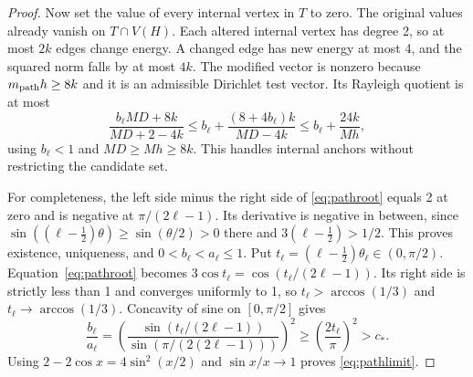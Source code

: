 \begin{proof}
Now set the value of every internal vertex in $T$ to zero. The
original values already vanish on $T\cap V(H)$. Each altered
internal vertex has degree 2, so at most $2k$ edges change energy.
A changed edge has new energy at most 4, and the squared norm
falls by at most $4k$. The modified vector is nonzero because
$m_{\rm path} h\geq8k$ and it is an admissible Dirichlet test vector. Its
Rayleigh quotient is at most
\[
 \frac{b_\ell MD+8k}{MD+2-4k}
 \leq b_\ell+\frac{(8+4b_\ell)k}{MD-4k}
 \leq b_\ell+\frac{24k}{Mh},
\]
using $b_\ell<1$ and $MD\geq Mh\geq8k$.
This handles internal anchors without restricting the candidate set.

For completeness, the left side minus the right side of
\eqref{eq:pathroot} equals 2 at zero and is negative at
$\pi/(2\ell-1)$. Its derivative is negative in between, since
$\sin((\ell-\tfrac12)\theta)\geq\sin(\theta/2)>0$ there and
$3(\ell-\tfrac12)>1/2$. This proves existence, uniqueness, and
$0<b_\ell<a_\ell\leq1$. Put
$t_\ell=(\ell-\tfrac12)\theta_\ell\in(0,\pi/2)$.
Equation~\eqref{eq:pathroot} becomes
$3\cos t_\ell=\cos(t_\ell/(2\ell-1))$.
Its right side is strictly less than 1 and converges uniformly to 1,
so $t_\ell>\arccos(1/3)$ and
$t_\ell\to\arccos(1/3)$. Concavity of sine on $[0,\pi/2]$ gives
\[
 \frac{b_\ell}{a_\ell}
 =\left(\frac{\sin(t_\ell/(2\ell-1))}
 {\sin(\pi/(2(2\ell-1)))}\right)^2
 \geq\left(\frac{2t_\ell}{\pi}\right)^2>c_*.
\]
Using $2-2\cos x=4\sin^2(x/2)$
and $\sin x/x\to1$ proves \eqref{eq:pathlimit}.
\end{proof}

